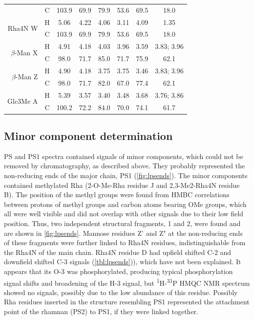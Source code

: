 \begin{table}[h]
\begin{tabular}{@{}rccccccc@{}}
				 & C & 103.9 & 69.9 & 79.9 & 53.6 & 69.5 & 18.0 \\
				\multirow{2}{*}{Rha4N W} & H & 5.06 & 4.22 & 4.06 & 3.11 & 4.09 & 1.35 \\
				 & C & 103.9 & 69.9 & 79.9 & 53.6 & 69.5 & 18.0 \\
				\multirow{2}{*}{$\beta$-Man X} & H & 4.91 & 4.18 & 4.03 & 3.96 & 3.59 & 3.83; 3.96 \\
				 & C & 98.0 & 71.7 & 85.0 & 71.7 & 75.9 & 62.1 \\
				\multirow{2}{*}{$\beta$-Man Z} & H & 4.90 & 4.18 & 3.75 & 3.75 & 3.46 & 3.83; 3.96 \\
				 & C & 98.0 & 71.7 & 82.0 & 67.0 & 77.4 & 62.1 \\
				\multirow{2}{*}{Glc3Me A} & H & 5.39 & 3.57 & 3.40 & 3.48 & 3.68 & 3.76; 3.86 \\
				 & C & 100.2 & 72.2 & 84.0 & 70.0 & 74.1 & 61.7 \\ \bottomrule 
			\end{tabular}
		\end{table}

	\subsection{Minor component determination} %
	\label{sub:minor_component_determination}

		 \ac{PS} and \ac{PS}1 spectra contained signals of minor components, which could not be removed by chromatography, as described above. They probably represented the non-reducing ends of the major chain, \ac{PS}1 (\cref{fig:lpsends}). The minor components contained methylated Rha (2-O-Me-Rha residue J and 2,3-Me2-Rha4N residue B). The position of the methyl groups were found from \ac{HMBC} correlations between protons of methyl groups and carbon atoms bearing OMe groups, which all were well visible and did not overlap with other signals due to their low field position. Thus, two independent structural fragments, 1 and 2, were found and are shown in \cref{fig:lpsends}. Mannose residues Z' and Z" at the non-reducing ends of these fragments were further linked to Rha4N residues, indistinguishable from the Rha4N of the main chain. Rha4N residue D had upfield shifted C-2 and downfield shifted C-3 signals (\cref{tbl:lpsends})), which have not been explained. It appears that its O-3 was phosphorylated, producing typical phosphorylation signal shifts and broadening of the H-3 signal, but \textsuperscript{1}H-\textsuperscript{31}P \ac{HMQC} \ac{NMR} spectrum showed no signals, possibly due to the low abundance of this residue. Possibly Rha residues inserted in the structure resembling PS1 represented the attachment point of the rhamnan (PS2) to \ac{PS}1, if they were linked together.

